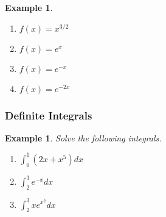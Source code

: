 \documentclass[12pt]{amsart}
\newtheorem{example}[theorem]{Example}
\newcommand\intd{\displaystyle\int}
\begin{document}
{\begin{example}
\begin{enumerate}
\vspace{3cm}

\item $f(x) = x^{3/2}$

\vspace{3cm}


\item $f(x) = e^x$

\vspace{3cm}

\item $f(x) = e^{-x}$

\vspace{3cm}

\item $f(x) = e^{-2x}$

\vspace{3cm}


\end{enumerate}

\end{example}


\newpage
\subsubsection{Definite Integrals}
\begin{example} Solve the following integrals.
\begin{enumerate}
\item $\intd_0^1 (2x+x^5)dx$
\vspace{3cm}

\item $\intd_2^3 e^{-x}dx$
\vspace{5cm}



\item $\intd_2^3 x e^{x^2}dx$
\vspace{5cm}





\end{enumerate}
\end{example}}
\end{document}
